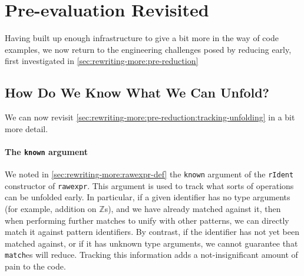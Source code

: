 \section{Pre-evaluation Revisited}\label{sec:rewriting-more:pre-reduction-again}

Having built up enough infrastructure to give a bit more in the way of code examples, we now return to the engineering challenges posed by reducing early, first investigated in \autoref{sec:rewriting-more:pre-reduction}


\subsection{How Do We Know What We Can Unfold?}\label{sec:rewriting-more:pre-reduction-again:tracking-unfolding}
We can now revisit \autoref{sec:rewriting-more:pre-reduction:tracking-unfolding} in a bit more detail.

\paragraph{The \texttt{known} argument}\label{sec:rewriting-more:rIdent-known}
We noted in \autoref{sec:rewriting-more:rawexpr-def} the \texttt{known} argument of the \texttt{rIdent} constructor of \texttt{rawexpr}.
This argument is used to track what sorts of operations can be unfolded early.
In particular, if a given identifier has no type arguments (for example, addition on $\mathbb{Z}$s), and we have already matched against it, then when performing further matches to unify with other patterns, we can directly match it against pattern identifiers.
By contrast, if the identifier has not yet been matched against, or if it has unknown type arguments, we cannot guarantee that \texttt{match}es will reduce.
Tracking this information adds a not-insignificant amount of pain to the code.

